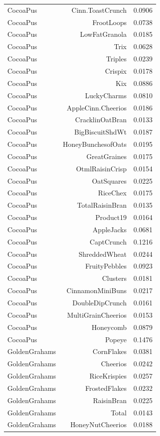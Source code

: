 \begin{longtable}{@{}lrr@{}}
CocoaPus & Cinn.ToastCrunch & 0.0906 \\
CocoaPus & FrootLoops & 0.0738 \\
CocoaPus & LowFatGranola & 0.0185 \\
CocoaPus & Trix & 0.0628 \\
CocoaPus & Triples & 0.0239 \\
CocoaPus & Crispix & 0.0178 \\
CocoaPus & Kix & 0.0886 \\
CocoaPus & LuckyCharms & 0.0810 \\
CocoaPus & AppleCinn.Cheerios & 0.0186 \\
CocoaPus & CracklinOatBran & 0.0133 \\
CocoaPus & BigBiscuitShdWt & 0.0187 \\
CocoaPus & HoneyBunchesofOats & 0.0195 \\
CocoaPus & GreatGraines & 0.0175 \\
CocoaPus & OtmlRaisinCrisp & 0.0154 \\
CocoaPus & OatSquares & 0.0225 \\
CocoaPus & RiceChex & 0.0175 \\
CocoaPus & TotalRaisinBran & 0.0135 \\
CocoaPus & Product19 & 0.0164 \\
CocoaPus & AppleJacks & 0.0681 \\
CocoaPus & CaptCrunch & 0.1216 \\
CocoaPus & ShreddedWheat & 0.0244 \\
CocoaPus & FruityPebbles & 0.0923 \\
CocoaPus & Clusters & 0.0181 \\
CocoaPus & CinnamonMiniBuns & 0.0217 \\
CocoaPus & DoubleDipCrunch & 0.0161 \\
CocoaPus & MultiGrainCheerios & 0.0153 \\
CocoaPus & Honeycomb & 0.0879 \\
CocoaPus & Popeye & 0.1476 \\
GoldenGrahams & CornFlakes & 0.0381 \\
GoldenGrahams & Cheerios & 0.0242 \\
GoldenGrahams & RiceKrispies & 0.0257 \\
GoldenGrahams & FrostedFlakes & 0.0232 \\
GoldenGrahams & RaisinBran & 0.0225 \\
GoldenGrahams & Total & 0.0143 \\
GoldenGrahams & HoneyNutCheerios & 0.0188 \\

\end{longtable}
